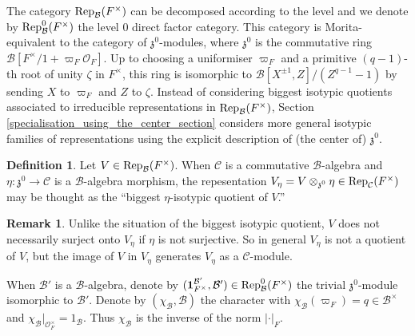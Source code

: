 \documentclass[11pt]{article}
\theoremstyle{plain}
\theoremstyle{definition}
\theoremstyle{plain}
\theoremstyle{definition}
\newtheorem*{defi_sans_num}{Definition}
\newtheorem*{rem_sans_num}{Remark}
\theoremstyle{plain}
\begin{document}
The category $\textup{Rep}_\mathcal{B}(F^\times)$ can be decomposed according to the level and we denote by $\textup{Rep}_\mathcal{B}^0(F^\times)$ the level $0$ direct factor category. This category is Morita-equivalent to the category of $\mathfrak{z}^0$-modules, where $\mathfrak{z}^0$ is the commutative ring $\mathcal{B}[F^\times / 1 + \varpi_F \mathcal{O}_F]$. Up to choosing a uniformiser $\varpi_F$ and a primitive $(q-1)$-th root of unity $\zeta$ in $F^\times$, this ring is isomorphic to $\mathcal{B}[X^{\pm 1},Z]/(Z^{q-1}-1)$ by sending $X$ to $\varpi_F$ and $Z$ to $\zeta$. Instead of considering biggest isotypic quotients associated to irreducible representations in $\textup{Rep}_\mathcal{B}(F^\times)$, Section \ref{specialisation_using_the_center_section} considers more general isotypic families of representations using the explicit description of (the center of) $\mathfrak{z}^0$. 

\begin{defi_sans_num} Let $V \in \textup{Rep}_\mathcal{B}(F^\times)$. When $\mathcal{C}$ is a commutative $\mathcal{B}$-algebra and $\eta : \mathfrak{z}^0 \to \mathcal{C}$ is a $\mathcal{B}$-algebra morphism, the repesentation $V_\eta = V \otimes_{\mathfrak{z}^0} \eta \in \textup{Rep}_\mathcal{C}(F^\times)$ may be thought as the ``biggest $\eta$-isotypic quotient of $V$.'' \end{defi_sans_num}

\begin{rem_sans_num} Unlike the situation of the biggest isotypic quotient, $V$ does not necessarily surject onto $V_\eta$ if $\eta$ is not surjective. So in general $V_\eta$ is not a quotient of $V$, but the image of $V$ in $V_\eta$ generates $V_\eta$ as a $\mathcal{C}$-module. \end{rem_sans_num}

When $\mathcal{B}'$ is a $\mathcal{B}$-algebra, denote by $(\textbf{1}_{F^\times}^{\mathcal{B}'},\mathcal{B}') \in \textup{Rep}_\mathcal{B}^0(F^\times)$ the trivial $\mathfrak{z}^0$-module isomorphic to $\mathcal{B}'$. Denote by $(\chi_\mathcal{B},\mathcal{B})$ the character with $\chi_\mathcal{B}(\varpi_F) = q \in \mathcal{B}^\times$ and $\chi_\mathcal{B}|_{\mathcal{O}_F^\times} = 1_\mathcal{B}$. Thus $\chi_\mathcal{B}$ is the inverse of the norm $| \cdot |_F$.
\end{document}
